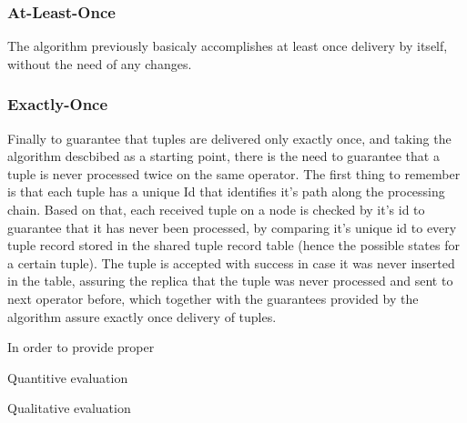 \documentclass[times, 10pt,twocolumn]{article}
\newcommand{\forceindent}{\leavevmode{\parindent=1em\indent}}
\begin{document}
\subsubsection{At-Least-Once}

\forceindent The algorithm previously basicaly accomplishes at least once
delivery by itself, without the need of any changes. 

\subsubsection{Exactly-Once}

\forceindent Finally to guarantee that tuples are delivered only exactly
once, and taking the algorithm descbibed as a starting point, there is the
need to guarantee that a tuple is never processed twice on the same
operator. The first thing to remember is that each tuple has a unique Id
that identifies it's path along the processing chain. Based on that, each
received tuple on a node is checked by it's id to guarantee that it has
never been processed, by comparing it's unique id to every tuple record
stored in the shared tuple record table (hence the possible states for a
certain tuple).  The tuple is accepted with success in case it was never
inserted in the table, assuring the replica that the tuple was never
processed and sent to next operator before, which together with the
guarantees provided by the algorithm assure exactly once delivery of
tuples.


In order to provide proper  


Quantitive evaluation


Qualitative evaluation

\end{document}
